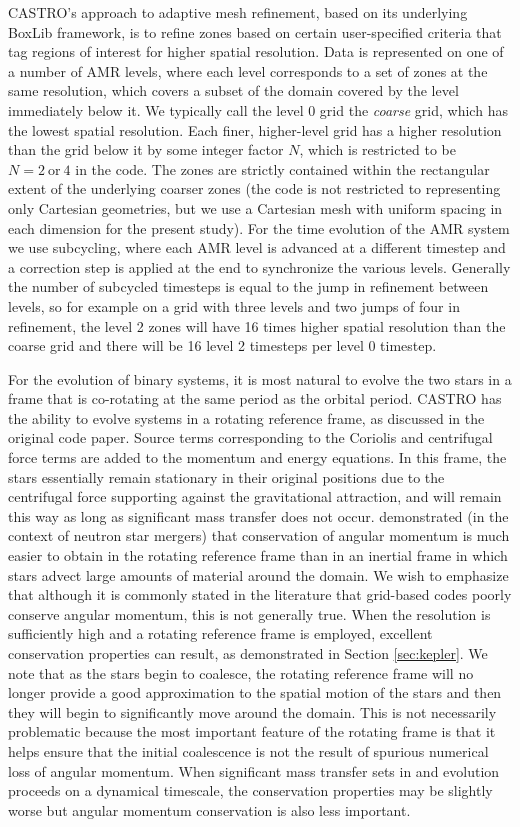 \documentclass[12pt,preprint]{aastex}
\begin{document}
CASTRO's approach to adaptive mesh refinement, based on its underlying BoxLib framework, is to refine zones based on certain user-specified criteria that tag regions of interest for higher spatial resolution. Data is represented on one of a number of AMR levels, where each level corresponds to a set of zones at the same resolution, which covers a subset of the domain covered by the level immediately below it. We typically call the level 0 grid the \textit{coarse} grid, which has the lowest spatial resolution. Each finer, higher-level grid has a higher resolution than the grid below it by some integer factor $N$, which is restricted to be $N = 2\ \text{or}\ 4$ in the code. The zones are strictly contained within the rectangular extent of the underlying coarser zones (the code is not restricted to representing only Cartesian geometries, but we use a Cartesian mesh with uniform spacing in each dimension for the present study). For the time evolution of the AMR system we use subcycling, where each AMR level is advanced at a different timestep and a correction step is applied at the end to synchronize the various levels. Generally the number of subcycled timesteps is equal to the jump in refinement between levels, so for example on a grid with three levels and two jumps of four in refinement, the level 2 zones will have 16 times higher spatial resolution than the coarse grid and there will be 16 level 2 timesteps per level 0 timestep.

For the evolution of binary systems, it is most natural to evolve the two stars in a frame that is co-rotating at the same period as the orbital period. CASTRO has the ability to evolve systems in a rotating reference frame, as discussed in the original code paper. Source terms corresponding to the Coriolis and centrifugal force terms are added to the momentum and energy equations. In this frame, the stars essentially remain stationary in their original positions due to the centrifugal force supporting against the gravitational attraction, and will remain this way as long as significant mass transfer does not occur. \cite{swesty00} demonstrated (in the context of neutron star mergers) that conservation of angular momentum is much easier to obtain in the rotating reference frame than in an inertial frame in which stars advect large amounts of material around the domain. We wish to emphasize that although it is commonly stated in the literature that grid-based codes poorly conserve angular momentum, this is not generally true. When the resolution is sufficiently high and a rotating reference frame is employed, excellent conservation properties can result, as demonstrated in Section \ref{sec:kepler}. We note that as the stars begin to coalesce, the rotating reference frame will no longer provide a good approximation to the spatial motion of the stars and then they will begin to significantly move around the domain. This is not necessarily problematic because the most important feature of the rotating frame is that it helps ensure that the initial coalescence is not the result of spurious numerical loss of angular momentum. When significant mass transfer sets in and evolution proceeds on a dynamical timescale, the conservation properties may be slightly worse but angular momentum conservation is also less important.
\end{document}

